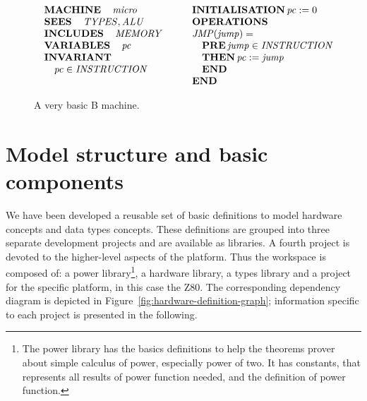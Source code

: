 \documentclass[11pt]{article} %
\begin{document}
\begin{figure}[h]
  $$
  \begin{array}{lcl}
    \begin{array}[t]{l}
      \operatorname{\mathbf{MACHINE}} \quad  \mathit{micro} \\
      \operatorname{\mathbf{SEES}} \quad \mathit{TYPES}, \mathit{ALU} \\
      \operatorname{\mathbf{INCLUDES}}  \quad \mathit{MEMORY} \\
      \operatorname{\mathbf{VARIABLES}} \quad    \mathit{pc}  \\
      \operatorname{\mathbf{INVARIANT}}\\ 
      \quad \mathit{pc} \in \mathit{INSTRUCTION} 
    \end{array}
    & \hspace*{0cm} &
    \begin{array}[t]{l}
      \operatorname{\mathbf{INITIALISATION}}  \mathit{pc} := 0 \\
      \operatorname{\mathbf{OPERATIONS}}\\
      \mathit{JMP} \mathit{( jump )} = \\
      \quad \operatorname{\mathbf{PRE}} \mathit{jump} \in \mathit{INSTRUCTION}\\ 
      \quad \operatorname{\mathbf{THEN}} \mathit{pc} := \mathit{jump}\\  
      \quad \operatorname{\mathbf{END}} \\
      \operatorname{\mathbf{END}}
    \end{array}
  \end{array}
  $$
\caption{A very basic B machine.}
\label{fig:maqB}
\end{figure}


\section{Model structure and basic components}
\label{sec:models}

We have been developed a reusable set of basic definitions to model hardware concepts and data types
concepts. These definitions are grouped into three separate development projects
and are available as libraries. A fourth project is devoted to the higher-level aspects of the platform. Thus the workspace is
composed of: a power library\footnote{The power library has the basics definitions to help the theorems
prover about simple calculus of power, especially power of two. It has constants, that represents all
results of power function needed, and the definition of power function.}, a hardware library, a types
library and a project for the specific platform, in this case the Z80. The corresponding dependency
diagram is depicted in Figure~\ref{fig:hardware-definition-graph}; information specific to each project is
presented in the following.
\end{document}
